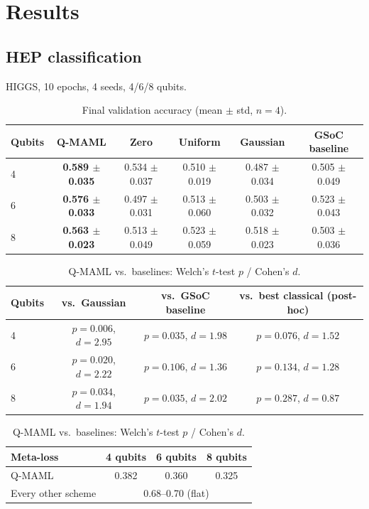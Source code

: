 \documentclass[11pt]{article}
\begin{document}
\section{Results}
\label{sec:results}

\subsection{HEP classification}
\label{sec:classification}
HIGGS, 10 epochs, 4 seeds, 4/6/8 qubits.

\begin{table}[ht]
\centering
\caption{Final validation accuracy (mean $\pm$ std, $n=4$).}
\label{tab:classification-results}
\begin{tabular}{lccccc}
\toprule
Qubits & Q-MAML & Zero & Uniform & Gaussian & GSoC baseline \\
\midrule
4 & \textbf{0.589 $\pm$ 0.035} & 0.534 $\pm$ 0.037 & 0.510 $\pm$ 0.019 & 0.487 $\pm$ 0.034 & 0.505 $\pm$ 0.049 \\
6 & \textbf{0.576 $\pm$ 0.033} & 0.497 $\pm$ 0.031 & 0.513 $\pm$ 0.060 & 0.503 $\pm$ 0.032 & 0.523 $\pm$ 0.043 \\
8 & \textbf{0.563 $\pm$ 0.023} & 0.513 $\pm$ 0.049 & 0.523 $\pm$ 0.059 & 0.518 $\pm$ 0.023 & 0.503 $\pm$ 0.036 \\
\bottomrule
\end{tabular}
\end{table}

\begin{table}[ht]
\centering\small
\caption{Q-MAML vs.\ baselines: Welch's $t$-test $p$ / Cohen's $d$.}
\label{tab:significance}
\begin{tabular}{lccc}
\toprule
Qubits & vs.\ Gaussian & vs.\ GSoC baseline & vs.\ best classical (post-hoc) \\
\midrule
4 & $p{=}0.006$, $d{=}2.95$ & $p{=}0.035$, $d{=}1.98$ & $p{=}0.076$, $d{=}1.52$ \\
6 & $p{=}0.020$, $d{=}2.22$ & $p{=}0.106$, $d{=}1.36$ & $p{=}0.134$, $d{=}1.28$ \\
8 & $p{=}0.034$, $d{=}1.94$ & $p{=}0.035$, $d{=}2.02$ & $p{=}0.287$, $d{=}0.87$ \\
\bottomrule
\end{tabular}

\vspace{4pt}
\begin{tabular}{lccc}
\toprule
Meta-loss & 4 qubits & 6 qubits & 8 qubits \\
\midrule
Q-MAML & 0.382 & 0.360 & 0.325 \\
Every other scheme & \multicolumn{3}{c}{0.68--0.70 (flat)} \\
\bottomrule
\end{tabular}
\end{table}
\end{document}
